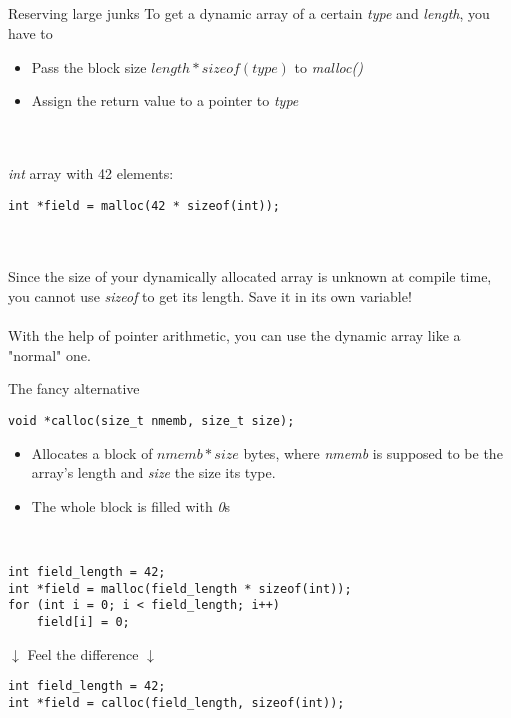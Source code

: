 \subsection{}
\begin{frame}[fragile]{Reserving large junks}
	To get a dynamic array of a certain \textit{type} and \textit{length}, you have to
	\begin{itemize}
		\item Pass the block size $length * sizeof(type)$ to \textit{malloc()}
		\item Assign the return value to a pointer to \textit{type}
	\end{itemize}\ \\
	\ \\
	\textit{int} array with 42 elements:
	\begin{lstlisting}[numbers=none]
int *field = malloc(42 * sizeof(int));
\end{lstlisting}\ \\
	\ \\
	Since the size of your dynamically allocated array is unknown at compile time, you cannot use \textit{sizeof} to get its length. Save it in its own variable!\\
	\ \\
	With the help of pointer arithmetic, you can use the dynamic array like a "normal" one.
	
\end{frame}
\begin{frame}[fragile]{The fancy alternative}
		\begin{lstlisting}[numbers=none]
void *calloc(size_t nmemb, size_t size);
\end{lstlisting}
	\begin{itemize}
		\item Allocates a block of $nmemb * size$ bytes, where \textit{nmemb} is supposed to be the array's length and \textit{size} the size its type.
		\item The whole block is filled with \textit{0}s
	\end{itemize}
	\ \\
	\begin{lstlisting}[numbers=none]
int field_length = 42;
int *field = malloc(field_length * sizeof(int));
for (int i = 0; i < field_length; i++)
	field[i] = 0;
\end{lstlisting}
	\center	$\downarrow$ Feel the difference $\downarrow$
	\begin{lstlisting}[numbers=none]
int field_length = 42;
int *field = calloc(field_length, sizeof(int));
\end{lstlisting}
\end{frame}
